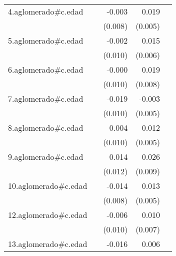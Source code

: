 {\begin{longtable}{l*{4}{D{.}{.}{-1}}}
\addlinespace
4.aglomerado#c.edad&                     &      -0.003         &       0.019\sym{***}&                     \\
            &                     &     (0.008)         &     (0.005)         &                     \\
\addlinespace
5.aglomerado#c.edad&                     &      -0.002         &       0.015\sym{**} &                     \\
            &                     &     (0.010)         &     (0.006)         &                     \\
\addlinespace
6.aglomerado#c.edad&                     &      -0.000         &       0.019\sym{*}  &                     \\
            &                     &     (0.010)         &     (0.008)         &                     \\
\addlinespace
7.aglomerado#c.edad&                     &      -0.019         &      -0.003         &                     \\
            &                     &     (0.010)         &     (0.005)         &                     \\
\addlinespace
8.aglomerado#c.edad&                     &       0.004         &       0.012\sym{*}  &                     \\
            &                     &     (0.010)         &     (0.005)         &                     \\
\addlinespace
9.aglomerado#c.edad&                     &       0.014         &       0.026\sym{**} &                     \\
            &                     &     (0.012)         &     (0.009)         &                     \\
\addlinespace
10.aglomerado#c.edad&                     &      -0.014         &       0.013\sym{*}  &                     \\
            &                     &     (0.008)         &     (0.005)         &                     \\
\addlinespace
12.aglomerado#c.edad&                     &      -0.006         &       0.010         &                     \\
            &                     &     (0.010)         &     (0.007)         &                     \\
\addlinespace
13.aglomerado#c.edad&                     &      -0.016         &       0.006         &                     \\

\end{longtable}}
